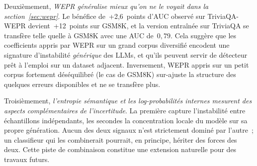 Deuxièmement, \emph{WEPR généralise mieux qu'on ne le voyait dans la
section~\ref{sec:wepr}}. Le bénéfice de~+2{,}6~points d'AUC observé sur
TriviaQA-WEPR devient~+12~points sur GSM8K, et la version entraînée sur
TriviaQA se transfère telle quelle à GSM8K avec une AUC de~$0{,}79$.
Cela suggère que les coefficients appris par WEPR sur un grand corpus
diversifié encodent une signature d'instabilité \emph{générique} des
LLMs, et qu'ils peuvent servir de détecteur prêt à l'emploi sur un
dataset adjacent. Inversement, WEPR appris sur un petit corpus
fortement déséquilibré (le cas de GSM8K) sur-ajuste la structure des
quelques erreurs disponibles et ne se transfère plus.

Troisièmement, \emph{l'entropie sémantique et les log-probabilités
internes mesurent des aspects complémentaires de l'incertitude}. La
première capture l'instabilité entre échantillons indépendants, les
secondes la concentration locale du modèle sur sa propre génération.
Aucun des deux signaux n'est strictement dominé par l'autre~; un
classifieur qui les combinerait pourrait, en principe, hériter des
forces des deux. Cette piste de combinaison constitue une extension
naturelle pour des travaux futurs.

